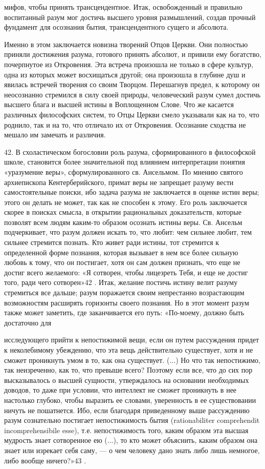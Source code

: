 \documentclass[a5paper,10pt]{article}
\begin{document}
мифов, чтобы принять трансцендентное. Итак, освобожденный и правильно
воспитанный разум мог достичь высшего уровня размышлений, создав прочный
фундамент для осознания бытия, трансцендентного сущего и абсолюта.

Именно в этом заключается новизна творений Отцов Церкви. Они полностью приняли
достижения разума, готового принять абсолют, и привили ему богатство,
почерпнутое из Откровения. Эта встреча произошла не только в сфере культур,
одна из которых может восхищаться другой; она произошла в глубине душ и явилась
встречей творения со своим Творцом. Перешагнув предел, к которому он
неосознанно стремился в силу своей природы, человеческий разум сумел достичь
высшего блага и высшей истины в Воплощенном Слове. Что же касается различных
философских систем, то Отцы Церкви смело указывали как на то, что роднило, так
и на то, что отличало их от Откровения. Осознание сходства не мешало им
замечать и различия.

42. В схоластическом богословии роль разума, сформированного в философской
школе, становится более значительной под влиянием интерпретации понятия
«уразумение веры», сформулированного св. Ансельмом. По мнению святого
архиепископа Кентерберийского, примат веры не запрещает разуму вести
самостоятельные поиски, ибо задача разума не заключается в оценке истин веры;
этого он делать не может, так как не способен к этому. Его роль заключается
скорее в поисках смысла, в открытии рациональных доказательств, которые
позволят всем людям каким-то образом осознать истины веры. Св. Ансельм
подчеркивает, что разум должен искать то, что любит: чем сильнее любит, тем
сильнее стремится познать. Кто живет ради истины, тот стремится к определенной
форме познания, которая вызывает в нем все более сильную любовь к тому, что он
постигает, хотя он сам должен признать, что еще не достиг всего желаемого: «Я
сотворен, чтобы лицезреть Тебя, и еще не достиг того, ради чего сотворен»42 .
Итак, желание постичь истину велит разуму стремиться все дальше; разум
поражается своим непрестанно возрастающим возможностям расширять горизонты
своего познания. Но в этот момент разум также может заметить, где заканчивается
его путь: «По-моему, должно быть достаточно для

исследующего прийти к непостижимой вещи, если он путем рассуждения придет к
неколебимому убеждению, что эта вещь действительно существует, хотя и не сможет
проникнуть умом в то, как она существует. (...) Но что так непостижимо, так
неизреченно, как то, что превыше всего? Поэтому если все, что до сих пор
высказывалось о высшей сущности, утверждалось на основании необходимых доводов,
то даже при условии, что интеллект не сможет проникнуть в нее настолько
глубоко, чтобы выразить ее словами, уверенность в ее существовании ничуть не
пошатнется. Ибо, если благодаря приведенному выше рассуждению разум сознательно
постигает непостижимость бытия (rationabiliter comprehendit incomprehensibile
esse), т.е. непостижимость того, каким образом эта высшая мудрость знает
сотворенное ею (...), то кто может объяснить, каким образом она знает или
изрекает себя саму, — о чем человеку дано знать либо лишь немногое, либо вообще
ничего?»43 .
\end{document}
